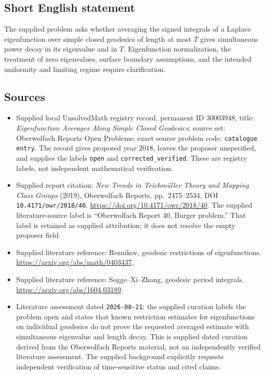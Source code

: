 \documentclass[11pt]{article}
\begin{document}
\subsection{Short English statement}
The supplied problem asks whether averaging the signed integrals of a Laplace eigenfunction over simple closed geodesics of length at most \(T\) gives simultaneous power decay in its eigenvalue and in \(T\). Eigenfunction normalization, the treatment of zero eigenvalues, surface boundary assumptions, and the intended uniformity and limiting regime require clarification.
\subsection{Sources}
\begin{itemize}
\item Supplied local UnsolvedMath registry record, permanent ID \(30003948\), title: \emph{Eigenfunction Averages Along Simple Closed Geodesics}; source set: Oberwolfach Reports Open Problems; exact source problem code: \texttt{catalogue entry}. The record gives proposed year \(2018\), leaves the proposer unspecified, and supplies the labels \texttt{open} and \texttt{corrected\_verified}. These are registry labels, not independent mathematical verification.
\item Supplied report citation: \emph{New Trends in Teichmüller Theory and Mapping Class Groups} (2019), Oberwolfach Reports, pp.\ 2475--2534, DOI \texttt{10.4171/owr/2018/40}. \url{https://doi.org/10.4171/owr/2018/40}. The supplied literature-source label is ``Oberwolfach Report 40, Burger problem.'' That label is retained as supplied attribution; it does not resolve the empty proposer field.
\item Supplied literature reference: Reznikov, geodesic restrictions of eigenfunctions. \url{https://arxiv.org/abs/math/0403437}.
\item Supplied literature reference: Sogge--Xi--Zhang, geodesic period integrals. \url{https://arxiv.org/abs/1604.03189}.
\item Literature assessment dated \texttt{2026-08-21}: the supplied curation labels the problem open and states that known restriction estimates for eigenfunctions on individual geodesics do not prove the requested averaged estimate with simultaneous eigenvalue and length decay. This is supplied dated curation derived from the Oberwolfach Reports material, not an independently verified literature assessment. The supplied background explicitly requests independent verification of time-sensitive status and cited claims.
\end{itemize}
\end{document}
